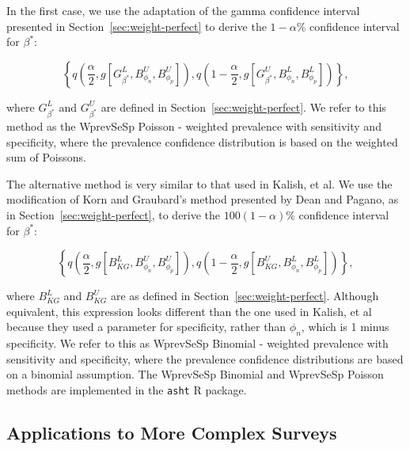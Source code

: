 In the first case, we use the adaptation of the gamma confidence interval\cite{FayF:1997} presented in Section~\ref{sec:weight-perfect} to derive the \( 1 - \alpha \)\% confidence interval for \( \beta^* \):

\begin{equation}
    \left\{ q \left( \frac{\alpha}{2}, %
    g \left[ G^L_{\beta^*}, B^U_{\phi_n}, B^U_{\phi_p} \right]
    \right), q \left( 1 - \frac{\alpha}{2}, %
       g \left[G^U_{\beta^*}, B^L_{\phi_n}, B^L_{\phi_p} \right] \right)
       \right\},
\end{equation}

where \( G_{\beta^*}^L \) and \( G_{\beta^*}^U \) are defined in Section~\ref{sec:weight-perfect}.
We refer to this method as the WprevSeSp Poisson - weighted prevalence with sensitivity and specificity, where the prevalence confidence distribution is based on the weighted sum of Poissons.

The alternative method is very similar to that used in Kalish, et al.\cite{Kali:2021}
We use the modification of Korn and Graubard's method\cite{Korn:1998} presented by Dean and Pagano,\cite{Dean:2015} as in Section~\ref{sec:weight-perfect}, to derive the \( 100(1 - \alpha) \)\% confidence interval for \( \beta^* \):

\begin{equation}
    \left\{ q \left( \frac{\alpha}{2}, g\left[B_{KG}^L, B_{\phi_n}^U, B_{\phi_p}^U\right] \right), q \left( 1 - \frac{\alpha}{2}, g\left[B_{KG}^U, B_{\phi_n}^L, B_{\phi_p}^L\right] \right) \right\},
\end{equation}

where \( B_{KG}^L \) and \( B_{KG}^U \) are as defined in Section~\ref{sec:weight-perfect}. Although equivalent, this expression looks different than the one used in Kalish, et al\cite{Kali:2021} because they used a parameter for specificity, rather than $\phi_n$, which is 1 minus specificity.
We refer to this as WprevSeSp Binomial - weighted prevalence with sensitivity and specificity, where the prevalence confidence distributions are based on a binomial assumption.
The WprevSeSp Binomial and WprevSeSp Poisson methods are implemented in the \texttt{asht} R package.\cite{asht}

\subsection{Applications to More Complex Surveys}
\label{sec:complex-surveys}



